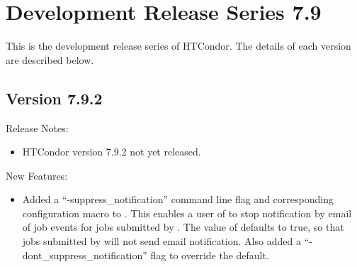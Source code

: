
\section{\label{sec:History-7-9}Development Release Series 7.9}

This is the development release series of HTCondor.
The details of each version are described below.

\subsection*{\label{sec:New-7-9-2}Version 7.9.2}

\noindent Release Notes:

\begin{itemize}

\item HTCondor version 7.9.2 not yet released.

\end{itemize}


\noindent New Features:

\begin{itemize}

\item Added a ``-suppress\_notification'' command line flag and corresponding
 configuration macro to .
This enables a user of  to stop notification by email of job
events for jobs submitted by . The value of
 defaults to true, so that jobs submitted
by  will not send email notification. Also added a
``-dont\_suppress\_notification'' flag to override the default.

\end{itemize}


